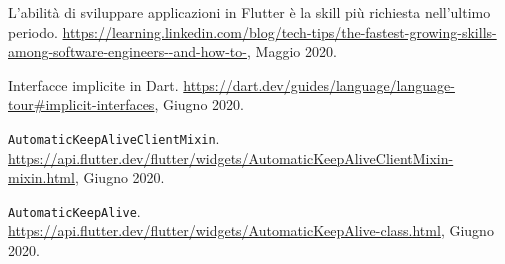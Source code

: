 \begin{thebibliography}{3}
L'abilità di sviluppare applicazioni in Flutter è la skill più richiesta nell'ultimo periodo. \url{https://learning.linkedin.com/blog/tech-tips/the-fastest-growing-skills-among-software-engineers--and-how-to-}, Maggio 2020.

Interfacce implicite in Dart. \url{https://dart.dev/guides/language/language-tour#implicit-interfaces}, Giugno 2020.

\verb|AutomaticKeepAliveClientMixin|. \url{https://api.flutter.dev/flutter/widgets/AutomaticKeepAliveClientMixin-mixin.html}, Giugno 2020.

\verb|AutomaticKeepAlive|. \url{https://api.flutter.dev/flutter/widgets/AutomaticKeepAlive-class.html}, Giugno 2020.

\end{thebibliography}
\nonfrenchspacing